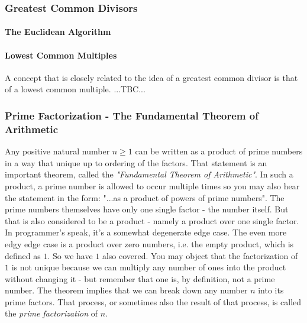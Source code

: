 \subsubsection{Greatest Common Divisors}

\paragraph{The Euclidean Algorithm}


\paragraph{Lowest Common Multiples}
A concept that is closely related to the idea of a greatest common divisor is that of a lowest common multiple. ...TBC...





\subsubsection{Prime Factorization - The Fundamental Theorem of Arithmetic}
Any positive natural number $n \geq 1$ can be written as a product of prime numbers in a way that unique up to ordering of the factors. That statement is an important theorem, called the \emph{"Fundamental Theorem of Arithmetic"}. In such a product, a prime number is allowed to occur multiple times so you may also hear the statement in the form: "...as a product of powers of prime numbers". The prime numbers themselves have only one single factor - the number itself. But that is also considered to be a product - namely a product over one single factor. In programmer's speak, it's a somewhat degenerate edge case. The even more edgy edge case is a product over zero numbers, i.e. the empty product, which is defined as $1$. So we have $1$ also covered. You may object that the factorization of $1$ is not unique because we can multiply any number of ones into the product without changing it - but remember that one is, by definition, not a prime number. The theorem implies that we can break down any number $n$ into its prime factors. That process, or sometimes also the result of that process, is called the \emph{prime factorization} of $n$.


